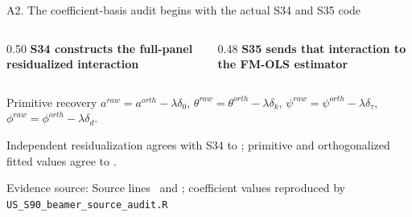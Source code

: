 \documentclass[10pt,aspectratio=169]{beamer}
\newcommand{\sourcefooter}[1]{%
  \par\vfill{\tiny\color{gray!70}Evidence source: #1}\vspace{-0.35em}}
\begin{document}
\begin{frame}{A2. The coefficient-basis audit begins with the actual S34 and S35 code}
  \begin{columns}[T,onlytextwidth]
    \begin{column}{0.50\textwidth}
      \textbf{S34 constructs the full-panel residualized interaction}
      
    \end{column}
    \begin{column}{0.48\textwidth}
      \textbf{S35 sends that interaction to the FM-OLS estimator}
      
    \end{column}
  \end{columns}
  \vspace{-0.2em}
  \begin{block}{Primitive recovery}
    \centering\small
    $a^{raw}=a^{orth}-\lambda\delta_0$, \quad
    $\theta^{raw}=\theta^{orth}-\lambda\delta_k$, \quad
    $\psi^{raw}=\psi^{orth}-\lambda\delta_{\tau}$, \quad
    $\phi^{raw}=\phi^{orth}-\lambda\delta_d$.
  \end{block}
  \scriptsize Independent residualization agrees with S34 to \texttt{\SthirtyFourResidualDifference}; primitive and orthogonalized fitted values agree to \texttt{\OrthPrimitiveFitDifference}.
  \sourcefooter{Source lines \LineSthirtyFourOrth\ and \LineSthirtyFiveFmols; coefficient values reproduced by \texttt{US\_S90\_beamer\_source\_audit.R}}
\end{frame}
\end{document}
